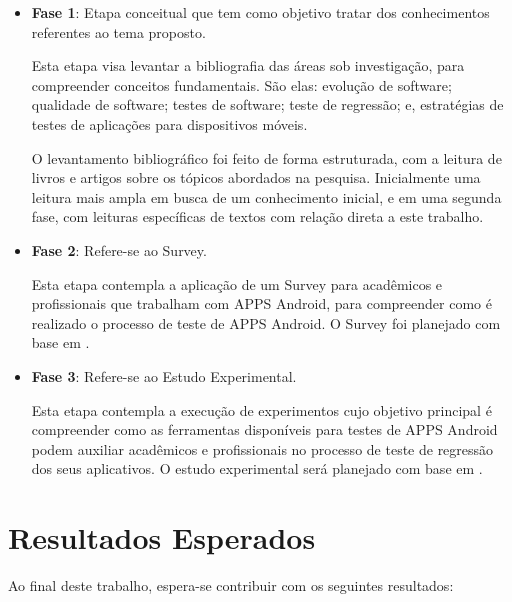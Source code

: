 \begin{itemize}
  \item \textbf{Fase 1}: Etapa conceitual que tem como objetivo tratar dos conhecimentos referentes ao tema proposto.
  
  
  Esta etapa visa levantar a bibliografia das áreas sob investigação, para compreender conceitos fundamentais. São elas: evolução de software; qualidade de software; testes de software; teste de regressão; e, estratégias de testes de aplicações para dispositivos móveis.
  
  O levantamento bibliográfico foi feito de forma estruturada, com a leitura de livros e artigos sobre os tópicos abordados na pesquisa. Inicialmente uma leitura mais ampla em busca de um conhecimento inicial, e em uma segunda fase, com leituras específicas de textos com relação direta a este trabalho.
  
  \item \textbf{Fase 2}: Refere-se ao Survey.
  
  Esta etapa contempla a aplicação de um Survey para acadêmicos e profissionais que trabalham com \ac{APPS} Android, para compreender como é realizado o processo de teste de \ac{APPS} Android. O Survey foi planejado com base em \cite{Kitchenham:2002:PSR:566493.566495}.
  
  \item \textbf{Fase 3}: Refere-se ao Estudo Experimental.
  
  Esta etapa contempla a execução de experimentos cujo objetivo principal é compreender como as ferramentas disponíveis para testes de \ac{APPS} Android podem auxiliar acadêmicos e profissionais no processo de teste de regressão dos seus aplicativos. O estudo experimental será planejado com base em \cite{Wohlin:2012:ESE:2349018}.
  
\end{itemize}

\section{Resultados Esperados}\label{sec:resultadosesperados}

Ao final deste trabalho, espera-se contribuir com os seguintes resultados:


